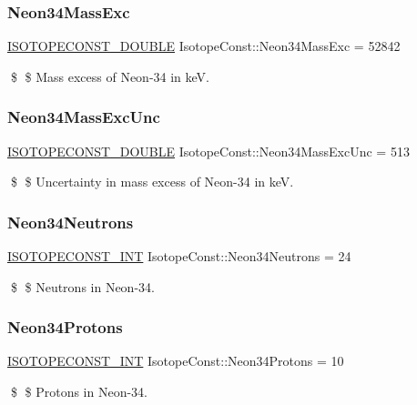 \subsubsection{\texorpdfstring{Neon34\+Mass\+Exc}{Neon34MassExc}}
{\footnotesize\ttfamily \mbox{\hyperlink{group___isotope_const-_macros_ga8f45a7272ce02c0b4c65c44636ed719a}{I\+S\+O\+T\+O\+P\+E\+C\+O\+N\+S\+T\+\_\+\+D\+O\+U\+B\+LE}} Isotope\+Const\+::\+Neon34\+Mass\+Exc = 52842}

\$ \$ Mass excess of Neon-\/34 in keV. \mbox{\label{group___isotope_const-_neon-_ne34_gae28f89d33086aa822c4f88d3cf9f2e12}} 
\subsubsection{\texorpdfstring{Neon34\+Mass\+Exc\+Unc}{Neon34MassExcUnc}}
{\footnotesize\ttfamily \mbox{\hyperlink{group___isotope_const-_macros_ga8f45a7272ce02c0b4c65c44636ed719a}{I\+S\+O\+T\+O\+P\+E\+C\+O\+N\+S\+T\+\_\+\+D\+O\+U\+B\+LE}} Isotope\+Const\+::\+Neon34\+Mass\+Exc\+Unc = 513}

\$ \$ Uncertainty in mass excess of Neon-\/34 in keV. \mbox{\label{group___isotope_const-_neon-_ne34_ga91128d24e75e698eed62cb3c3fc783f8}} 
\subsubsection{\texorpdfstring{Neon34\+Neutrons}{Neon34Neutrons}}
{\footnotesize\ttfamily \mbox{\hyperlink{group___isotope_const-_macros_ga5f18360b3e99483a35c32d789e62621c}{I\+S\+O\+T\+O\+P\+E\+C\+O\+N\+S\+T\+\_\+\+I\+NT}} Isotope\+Const\+::\+Neon34\+Neutrons = 24}

\$ \$ Neutrons in Neon-\/34. \mbox{\label{group___isotope_const-_neon-_ne34_ga5a846256fcef65fb27fbd6119325a8ae}} 
\subsubsection{\texorpdfstring{Neon34\+Protons}{Neon34Protons}}
{\footnotesize\ttfamily \mbox{\hyperlink{group___isotope_const-_macros_ga5f18360b3e99483a35c32d789e62621c}{I\+S\+O\+T\+O\+P\+E\+C\+O\+N\+S\+T\+\_\+\+I\+NT}} Isotope\+Const\+::\+Neon34\+Protons = 10}

\$ \$ Protons in Neon-\/34. 